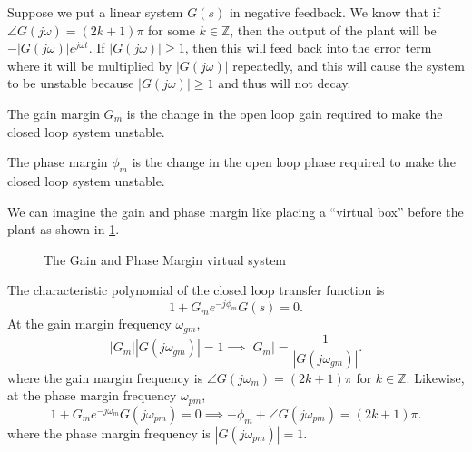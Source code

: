 Suppose we put a linear system $G(s)$ in negative feedback. 
We know that if $\angle G(j\omega) = (2k+1)\pi$ for some $k\in\mathbb{Z}$, then the output of the plant will be $-|G(j\omega)|e^{j\omega t}$.
If $|G(j\omega)| \geq 1$, then this will feed back into the error term where it will be multiplied by $|G(j\omega)|$ repeatedly, and this will cause the system to be unstable because $|G(j\omega)|\geq1$ and thus will not decay.
\begin{definition}
  The gain margin $G_m$ is the change in the open loop gain required to make the closed loop system unstable.
  \label{defn:gain-margin}
\end{definition}
\begin{definition}
  The phase margin $\phi_m$ is the change in the open loop phase required to make the closed loop system unstable.
  \label{defn:phase-margin}
\end{definition}
We can imagine the gain and phase margin like placing a ``virtual box'' before the plant as shown in \cref{fig:margin-controller}.
\begin{gitbook-image}
\begin{figure}[H]
    \centering 
    \caption{The Gain and Phase Margin virtual system}
    \label{fig:margin-controller}
\end{figure}
\end{gitbook-image}
The characteristic polynomial of the closed loop transfer function is
\[
  1 + G_me^{-j\phi_m}G(s) = 0.
\]
At the gain margin frequency $\omega_{gm}$,
\[
  |G_m||G(j\omega_{gm})| = 1 \implies |G_m| = \frac{1}{|G(j\omega_{gm})|}.
\]
where the gain margin frequency is $\angle G(j\omega_m) = (2k+1)\pi$ for $k\in\mathbb{Z}$.
Likewise, at the phase margin frequency $\omega_{pm}$, 
\[
  1 + G_me^{-j\omega_m}G(j\omega_{pm}) = 0 \implies -\phi_m + \angle G(j\omega_{pm}) = (2k+1)\pi.
\]
where the phase margin frequency is $|G(j\omega_{pm})| = 1$.

